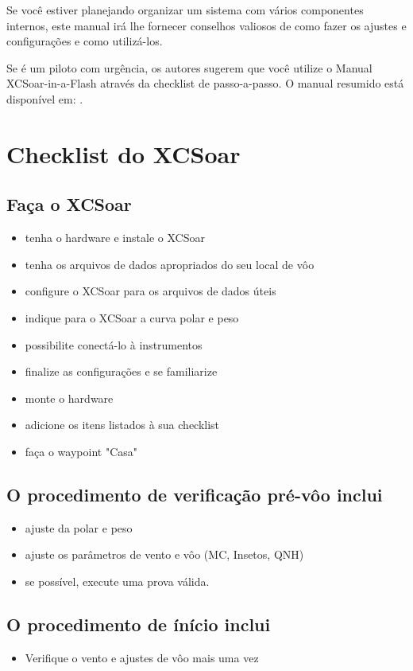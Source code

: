 Se você estiver planejando organizar um sistema com vários componentes internos, este manual irá lhe fornecer conselhos valiosos de como fazer os ajustes e configurações e como utilizá-los.

Se é um piloto com urgência, os autores sugerem que você utilize o Manual XCSoar-in-a-Flash através da checklist de passo-a-passo.  O manual resumido está disponível em: 
 .



\section{Checklist do XCSoar}

\subsection*{Faça o XCSoar}
\begin{itemize}
\item tenha o hardware e instale o XCSoar
\item tenha os arquivos de dados apropriados do seu local de vôo
\item configure o XCSoar para os arquivos de dados úteis
\item indique para o XCSoar a curva polar e peso
\item possibilite conectá-lo à instrumentos
\item finalize as configurações e se familiarize
\item monte o hardware
\item adicione os itens listados à sua checklist
\item faça o waypoint "Casa"
\end{itemize}

\subsection*{O procedimento de verificação pré-vôo inclui}
\begin{itemize}
\item ajuste da polar e peso
\item ajuste os parâmetros de vento e vôo (MC, Insetos, QNH)
\item se possível, execute uma prova válida.
\end{itemize}

\subsection*{O procedimento de ínício inclui}
\begin{itemize}
\item Verifique o vento e ajustes de vôo mais uma vez
\end{itemize}
\vspace{2em}

